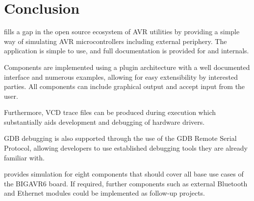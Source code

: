 
\chapter{Conclusion} \label{chapter:conclusion}

\qsimavr fills a gap in the open source ecosystem of \ac{AVR} utilities by
providing a simple way of simulating \ac{AVR} microcontrollers including
external periphery. The application is simple to use, and full documentation is
provided for \qsimavr and \simavr internals.

Components are implemented using a plugin architecture with a well documented
interface and numerous examples, allowing for easy extensibility by interested parties.
All components can include graphical output and accept input
from the user.

Furthermore, \ac{VCD} trace files can be produced during execution
which substantially aids development and debugging of hardware drivers.

\ac{GDB} debugging is also supported through the use of the \ac{GDB} Remote Serial
Protocol, allowing developers to use established debugging tools they are already
familiar with.

\qsimavr provides simulation for eight components that should cover
all base use cases of the BIGAVR6 board. If required, further components such
as external Bluetooth and Ethernet modules could be implemented as follow-up projects.
